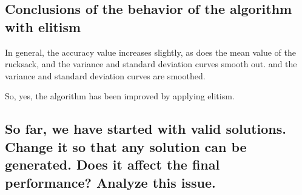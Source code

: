 \documentclass{article}
\begin{document}
    \subsection{Conclusions of the behavior of the algorithm with elitism}

    In general, the accuracy value increases slightly, as does the mean value of the rucksack, and the variance and standard deviation curves smooth out.
    and the variance and standard deviation curves are smoothed.
    
    So, yes, the algorithm has been improved by applying elitism.

    \subsection{So far, we have started with valid solutions. Change it so that any solution can be
    generated. Does it affect the final performance? Analyze this issue.}
\end{document}
